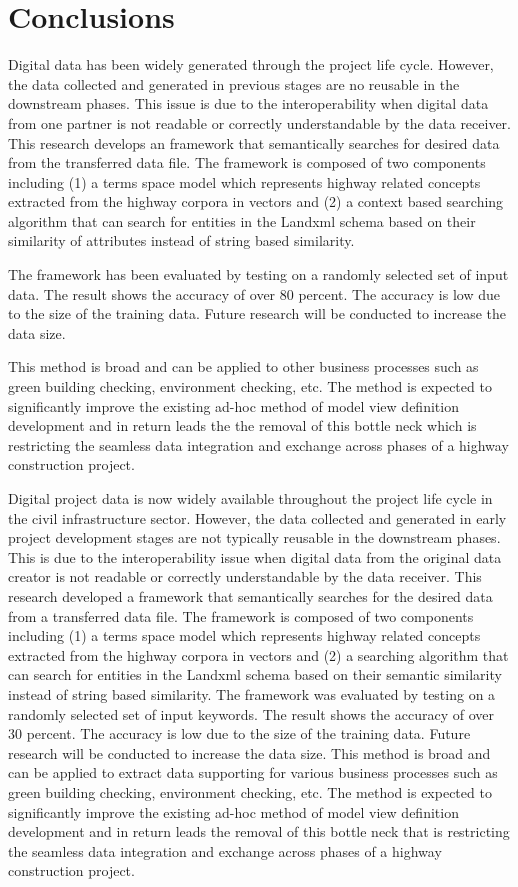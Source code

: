\documentclass[Journal, InsideFigs, DoubleSpace]{ascelike} %
\begin{document}
\section{Conclusions} \label{sec:conclns} 
Digital data has been widely generated through the project life cycle. However, the data collected and generated in previous stages are no reusable in the downstream phases. This issue is due to the interoperability when digital data from one partner is not readable or correctly understandable by the data receiver. This research develops an framework that semantically searches for desired data from the transferred data file. The framework is composed of two components including (1) a terms space model which represents highway related concepts extracted from the highway corpora in vectors and (2) a context based searching algorithm that can search for entities in the Landxml schema based on their similarity of attributes instead of string based similarity. 
\par
The framework has been evaluated by testing on a randomly selected set of input data. The result shows the accuracy of over 80 percent. The accuracy is low due to the size of the training data. Future research will be conducted to increase the data size. 
\par
This method is broad and can be applied to other business processes such as green building checking, environment checking, etc. The method is expected to significantly improve the existing ad-hoc method of model view definition development and in return leads the the removal of this bottle neck which is restricting the seamless data integration and exchange across phases of a highway construction project.

Digital project data is now widely available throughout the project life cycle in the civil infrastructure sector. However, the data collected and generated in early project development stages are not typically reusable in the downstream phases. This is due to the interoperability issue when digital data from the original data creator is not readable or correctly understandable by the data receiver. This research developed a framework that semantically searches for the desired data from a transferred data file. The framework is composed of two components including (1) a terms space model which represents highway related concepts extracted from the highway corpora in vectors and (2) a searching algorithm that can search for entities in the Landxml schema based on their semantic similarity instead of string based similarity. 
The framework was evaluated by testing on a randomly selected set of input keywords. The result shows the accuracy of over 30 percent. The accuracy is low due to the size of the training data. Future research will be conducted to increase the data size. 
This method is broad and can be applied to extract data supporting for various business processes such as green building checking, environment checking, etc. The method is expected to significantly improve the existing ad-hoc method of model view definition development and in return leads the removal of this bottle neck that is restricting the seamless data integration and exchange across phases of a highway construction project.
 


%
%
\end{document}
